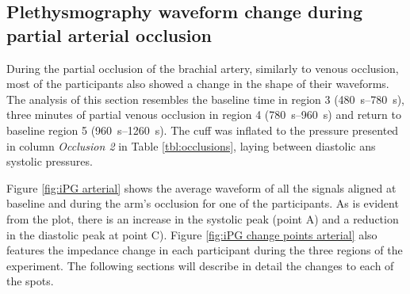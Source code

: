 \subsection{Plethysmography waveform change during partial arterial occlusion}
\label{section apa 2.2}
During the partial occlusion of the brachial artery, similarly to venous occlusion, most of the participants also showed a change in the shape of their waveforms. The analysis of this section resembles the baseline time in region 3 (\SIrange{480}{780}{\second}), three minutes of partial venous occlusion in region 4 (\SIrange{780}{960}{\second}) and return to baseline region 5 (\SIrange{960}{1260}{\second}). The cuff was inflated to the pressure presented in column \textit{Occlusion 2} in Table \ref{tbl:occlusions}, laying between diastolic ans systolic pressures.

Figure \ref{fig:iPG arterial} shows the average waveform of all the signals aligned at baseline and during the arm's occlusion for one of the participants. As is evident from the plot, there is an increase in the systolic peak (point A) and a reduction in the diastolic peak at point C). Figure \ref{fig:iPG change points arterial} also features the impedance change in each participant during the three regions of the experiment. The following sections will describe in detail the changes to each of the spots.

